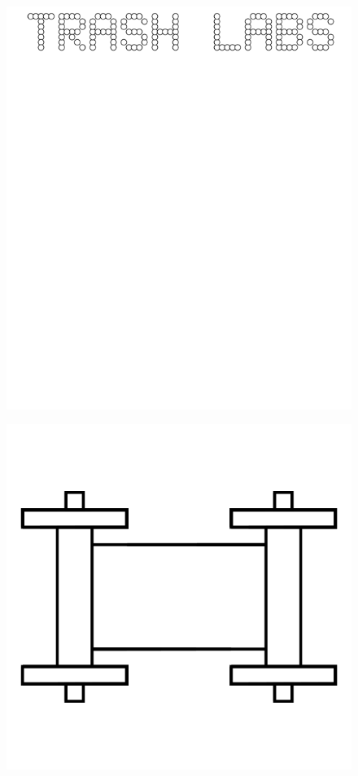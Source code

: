 \documentclass[17pt]{extreport}
\begin{document}
	\begin{figure}
		\centering
		\includegraphics[width=6.25in]{imageserver/uploadimages/trashlabs.png}
	\end{figure}

	\begin{figure}
		\centering
		\includegraphics[width=6.25in]{imageserver/uploadimages/image16.png}
	\end{figure}
	
\end{document}
